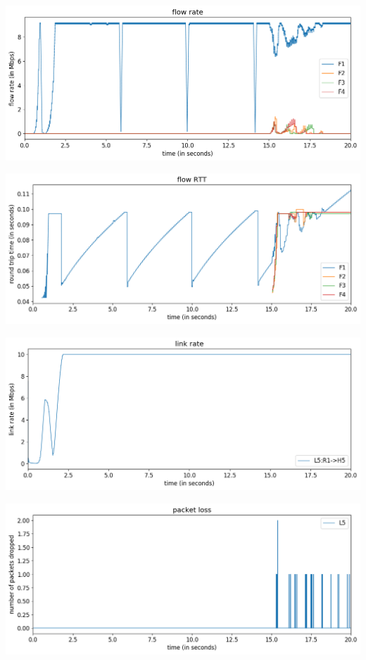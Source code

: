 \documentclass{article}
\begin{document}
\includegraphics[width = \textwidth]{"test_case5_reno flow rate"}

\includegraphics[width = \textwidth]{"test_case5_reno flow RTT"}

\includegraphics[width = \textwidth]{"test_case5_reno link rate"}

\includegraphics[width = \textwidth]{"test_case5_reno packet loss"}
\end{document}
